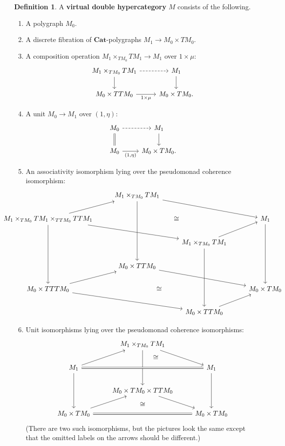 \documentclass{article}
\theoremstyle{definition}
\newtheorem{defn}[thm]{Definition}
\theoremstyle{remark}
\def\Cat{\ensuremath{\mathbf{Cat}}}
\begin{document}
\begin{defn}
  A \textbf{virtual double hypercategory} $M$ consists of the following.
  \begin{enumerate}
  \item A polygraph $M_0$.
  \item A discrete fibration of \Cat-polygraphs $M_1 \to M_0 \times TM_0$.
  \item A composition operation $M_1 \times_{TM_0} TM_1 \to M_1$ over $1\times \mu$:
    \[
    \begin{tikzcd}
      M_1 \times_{TM_0} TM_1 \ar[r,dashed] \ar[d] & M_1\ar[d]\\
      M_0 \times TTM_0 \ar[r,"1\times \mu"'] & M_0\times TM_0.
    \end{tikzcd}
    \]
  \item A unit $M_0 \to M_1$ over $(1,\eta)$:
    \[
    \begin{tikzcd}
      M_0 \ar[r,dashed] \ar[d,equals] & M_1 \ar[d] \\
      M_0\ar[r,"{(1,\eta)}"'] & M_0\times TM_0.
    \end{tikzcd}
    \]
  \item An associativity isomorphism lying over the pseudomonad coherence isomorphism:
    \[\hspace{-2cm}
    \begin{tikzcd}
      & M_1 \times_{TM_0} TM_1 \ar[drr] \ar[ddd]\\
      M_1 \times_{TM_0} TM_1 \times_{TTM_0} TTM_1 \ar[ur] \ar[drr] \ar[ddd] \ar[rrr,phantom,"\cong"] &&&
      M_1 \ar[ddd] \\
      && M_1 \times_{TM_0} TM_1  \ar[ur]\ar[ddd]\\
      & M_0\times TTM_0\ar[drr] \\
      M_0 \times TTTM_0 \ar[ur] \ar[drr] \ar[rrr,phantom,"\cong"] &&&
      M_0\times TM_0 \\
      && M_0\times TTM_0\ar[ur]
    \end{tikzcd}\hspace{-2cm}
    \]
  \item Unit isomorphisms lying over the pseudomonad coherence isomorphisms:
    \[
    \begin{tikzcd}
      & M_1 \times_{TM_0} TM_1 \ar[dr] \ar[dddr,phantom,"\cong" very near start] \ar[dd] \\
      M_1 \ar[rr,equals] \ar[ur]\ar[dd] &~ & M_1\ar[dd]\\
      & M_0\times TM_0 \times TTM_0 \ar[dr] \ar[d,phantom,"\cong"] \\
      M_0\times TM_0 \ar[rr,equals]\ar[ur] &~& M_0\times TM_0
    \end{tikzcd}
    \]
    (There are two such isomorphisms, but the pictures look the same except that the omitted labels on the arrows should be different.)
  \end{enumerate}
\end{defn}
\end{document}
